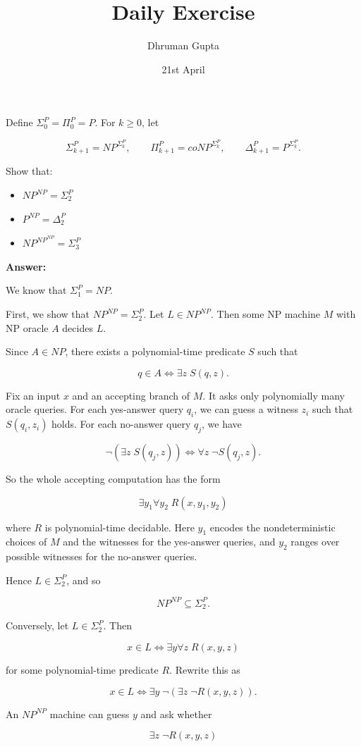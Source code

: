 \documentclass[11pt]{article}
\title{Daily Exercise}
\author{Dhruman Gupta}
\date{21st April}
\begin{document}

Define $\Sigma_0^P = \Pi_0^P = P$. For $k \geq 0$, let

\[
\Sigma_{k+1}^P = NP^{\Sigma_k^P}, \qquad
\Pi_{k+1}^P = coNP^{\Sigma_k^P}, \qquad
\Delta_{k+1}^P = P^{\Sigma_k^P}.
\]

Show that:
\begin{itemize}
    \item $NP^{NP} = \Sigma_2^P$
    \item $P^{NP} = \Delta_2^P$
    \item $NP^{NP^{NP}} = \Sigma_3^P$
\end{itemize}

\textbf{Answer:}

We know that $\Sigma_1^P = NP$.

First, we show that $NP^{NP} = \Sigma_2^P$. Let $L \in NP^{NP}$. Then some NP machine $M$ with NP oracle $A$ decides $L$.

Since $A \in NP$, there exists a polynomial-time predicate $S$ such that

\[
q \in A \iff \exists z \; S(q,z).
\]

Fix an input $x$ and an accepting branch of $M$. It asks only polynomially many oracle queries. For each yes-answer query $q_i$, we can guess a witness $z_i$ such that $S(q_i,z_i)$ holds. For each no-answer query $q_j$, we have

\[
\neg(\exists z\; S(q_j,z)) \iff \forall z\; \neg S(q_j,z).
\]

So the whole accepting computation has the form

\[
\exists y_1 \forall y_2 \; R(x,y_1,y_2)
\]

where $R$ is polynomial-time decidable. Here $y_1$ encodes the nondeterministic choices of $M$ and the witnesses for the yes-answer queries, and $y_2$ ranges over possible witnesses for the no-answer queries.

Hence $L \in \Sigma_2^P$, and so

\[
NP^{NP} \subseteq \Sigma_2^P.
\]

Conversely, let $L \in \Sigma_2^P$. Then

\[
x \in L \iff \exists y \forall z \; R(x,y,z)
\]

for some polynomial-time predicate $R$. Rewrite this as

\[
x \in L \iff \exists y \; \neg(\exists z \; \neg R(x,y,z)).
\]

An $NP^{NP}$ machine can guess $y$ and ask whether

\[
\exists z \; \neg R(x,y,z)
\]
\end{document}
